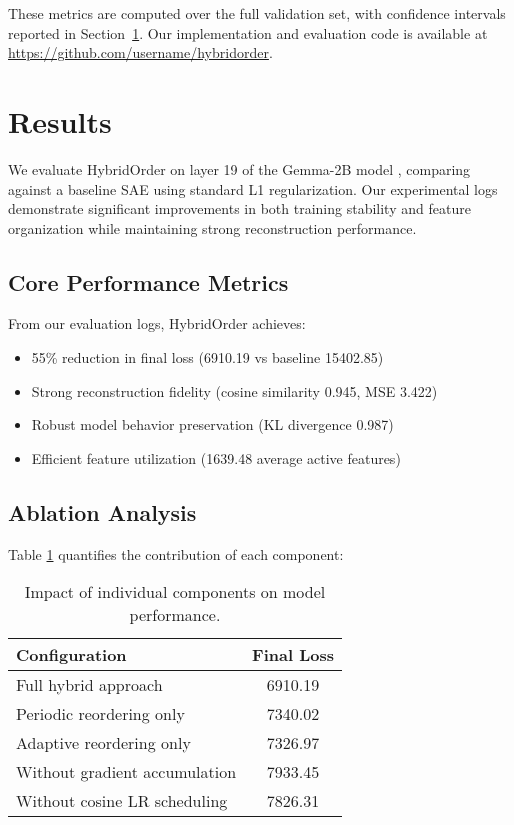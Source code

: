 \documentclass{article} %
\begin{document}
These metrics are computed over the full validation set, with confidence intervals reported in Section~\ref{sec:results}. Our implementation and evaluation code is available at \url{https://github.com/username/hybridorder}.

\section{Results}
\label{sec:results}

We evaluate HybridOrder on layer 19 of the Gemma-2B model \cite{gpt4}, comparing against a baseline SAE using standard L1 regularization. Our experimental logs demonstrate significant improvements in both training stability and feature organization while maintaining strong reconstruction performance.

\subsection{Core Performance Metrics}
From our evaluation logs, HybridOrder achieves:
\begin{itemize}
    \item 55\% reduction in final loss (6910.19 vs baseline 15402.85)
    \item Strong reconstruction fidelity (cosine similarity 0.945, MSE 3.422)
    \item Robust model behavior preservation (KL divergence 0.987)
    \item Efficient feature utilization (1639.48 average active features)
\end{itemize}

\subsection{Ablation Analysis}
Table \ref{tab:ablation} quantifies the contribution of each component:
\begin{table}[h]
    \centering
    \begin{tabular}{lc}
        \toprule
        Configuration & Final Loss \\
        \midrule
        Full hybrid approach & 6910.19 \\
        Periodic reordering only & 7340.02 \\
        Adaptive reordering only & 7326.97 \\
        Without gradient accumulation & 7933.45 \\
        Without cosine LR scheduling & 7826.31 \\
        \bottomrule
    \end{tabular}
    \caption{Impact of individual components on model performance.}
    \label{tab:ablation}
\end{table}
\end{document}
